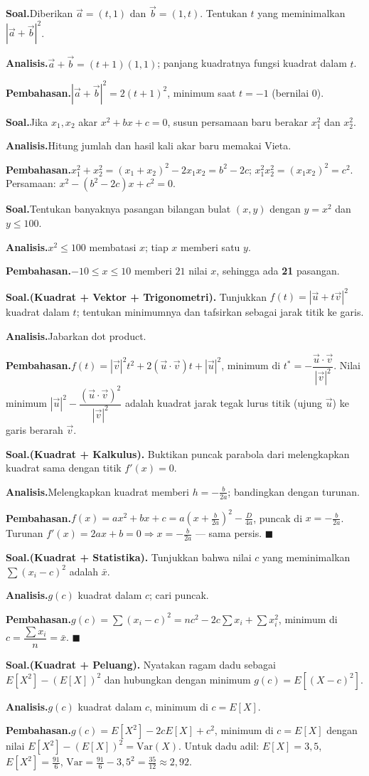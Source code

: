 \documentclass[11pt,a4paper]{report}
\theoremstyle{gaya}
\newcommand{\knomor}[1]{\par\medskip\noindent{\bfseries\color{ungu}#1}\par\nopagebreak}
\newcommand{\ksoal}{\noindent\textbf{\color{biru}Soal.}\space}
\newcommand{\kanalisis}{\par\noindent\textbf{\color{oranye}Analisis.}\space}
\newcommand{\kbahas}{\par\noindent\textbf{\color{hijau}Pembahasan.}\space}
\newcommand{\kbagian}[1]{\par\medskip\noindent{\large\bfseries\color{biru}#1}\par\smallskip}
\begin{document}
\knomor{C.3}
\ksoal Diberikan $\vec a=(t,1)$ dan $\vec b=(1,t)$. Tentukan $t$ yang meminimalkan $|\vec a+\vec b|^2$.
\kanalisis $\vec a+\vec b=(t+1)(1,1)$; panjang kuadratnya fungsi kuadrat dalam $t$.
\kbahas $|\vec a+\vec b|^2=2(t+1)^2$, minimum saat $t=-1$ (bernilai $0$).

\knomor{C.4}
\ksoal Jika $x_1,x_2$ akar $x^2+bx+c=0$, susun persamaan baru berakar $x_1^2$ dan $x_2^2$.
\kanalisis Hitung jumlah dan hasil kali akar baru memakai Vieta.
\kbahas $x_1^2+x_2^2=(x_1+x_2)^2-2x_1x_2=b^2-2c$; $x_1^2x_2^2=(x_1x_2)^2=c^2$. Persamaan: $x^2-(b^2-2c)x+c^2=0.$

\knomor{C.5}
\ksoal Tentukan banyaknya pasangan bilangan bulat $(x,y)$ dengan $y=x^2$ dan $y\le 100$.
\kanalisis $x^2\le100$ membatasi $x$; tiap $x$ memberi satu $y$.
\kbahas $-10\le x\le10$ memberi $21$ nilai $x$, sehingga ada \textbf{21} pasangan.

\kbagian{Bagian D}

\knomor{D.1}
\ksoal \textbf{(Kuadrat + Vektor + Trigonometri).} Tunjukkan $f(t)=|\vec u+t\vec v|^2$ kuadrat dalam $t$; tentukan minimumnya dan tafsirkan sebagai jarak titik ke garis.
\kanalisis Jabarkan dot product.
\kbahas $f(t)=|\vec v|^2t^2+2(\vec u\cdot\vec v)t+|\vec u|^2$, minimum di $t^*=-\dfrac{\vec u\cdot\vec v}{|\vec v|^2}$. Nilai minimum $|\vec u|^2-\dfrac{(\vec u\cdot\vec v)^2}{|\vec v|^2}$ adalah kuadrat jarak tegak lurus titik (ujung $\vec u$) ke garis berarah $\vec v$.

\knomor{D.2}
\ksoal \textbf{(Kuadrat + Kalkulus).} Buktikan puncak parabola dari melengkapkan kuadrat sama dengan titik $f'(x)=0$.
\kanalisis Melengkapkan kuadrat memberi $h=-\tfrac{b}{2a}$; bandingkan dengan turunan.
\kbahas $f(x)=ax^2+bx+c=a\left(x+\tfrac{b}{2a}\right)^2-\tfrac{D}{4a}$, puncak di $x=-\tfrac{b}{2a}$. Turunan $f'(x)=2ax+b=0\Rightarrow x=-\tfrac{b}{2a}$ --- sama persis. $\blacksquare$

\knomor{D.3}
\ksoal \textbf{(Kuadrat + Statistika).} Tunjukkan bahwa nilai $c$ yang meminimalkan $\sum(x_i-c)^2$ adalah $\bar x$.
\kanalisis $g(c)$ kuadrat dalam $c$; cari puncak.
\kbahas $g(c)=\sum(x_i-c)^2=nc^2-2c\sum x_i+\sum x_i^2$, minimum di $c=\dfrac{\sum x_i}{n}=\bar x.$ $\blacksquare$

\knomor{D.4}
\ksoal \textbf{(Kuadrat + Peluang).} Nyatakan ragam dadu sebagai $E[X^2]-(E[X])^2$ dan hubungkan dengan minimum $g(c)=E[(X-c)^2]$.
\kanalisis $g(c)$ kuadrat dalam $c$, minimum di $c=E[X]$.
\kbahas $g(c)=E[X^2]-2cE[X]+c^2$, minimum di $c=E[X]$ dengan nilai $E[X^2]-(E[X])^2=\mathrm{Var}(X)$. Untuk dadu adil: $E[X]=3{,}5$, $E[X^2]=\tfrac{91}{6}$, $\mathrm{Var}=\tfrac{91}{6}-3{,}5^2=\tfrac{35}{12}\approx2{,}92.$
\end{document}
